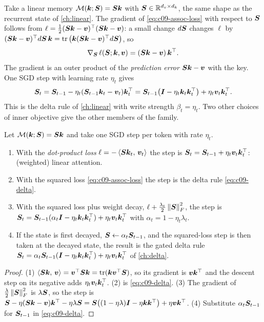 Take a linear memory $\mathcal{M}(\bm{k}; \bm{S}) = \bm{S}\bm{k}$ with $\bm{S} \in \mathbb{R}^{d_v \times d_k}$, the
same shape as the recurrent state of \cref{ch:linear}. The gradient of
\eqref{eq:c09-assoc-loss} with respect to $\bm{S}$ follows from
$\ell = \frac12 (\bm{S}\bm{k} - \bm{v})^{\top}(\bm{S}\bm{k} - \bm{v})$: a small change $d\bm{S}$ changes $\ell$ by
$(\bm{S}\bm{k} - \bm{v})^{\top} d\bm{S}\,\bm{k} = \operatorname{tr}\big(\bm{k} (\bm{S}\bm{k}-\bm{v})^{\top} d\bm{S}\big)$, so
\begin{equation}\label{eq:c09-lin-grad}
  \nabla_{\bm{S}}\, \ell(\bm{S}; \bm{k}, \bm{v}) = (\bm{S}\bm{k} - \bm{v})\,\bm{k}^{\top} .
\end{equation}
The gradient is an outer product of the \emph{prediction error} $\bm{S}\bm{k} - \bm{v}$ with the key.
One SGD step with learning rate $\eta_t$ gives
\begin{equation}\label{eq:c09-delta}
  \bm{S}_t = \bm{S}_{t-1} - \eta_t (\bm{S}_{t-1}\bm{k}_t - \bm{v}_t)\bm{k}_t^{\top}
        = \bm{S}_{t-1}\big(\bm{I} - \eta_t \bm{k}_t\bm{k}_t^{\top}\big) + \eta_t \bm{v}_t\bm{k}_t^{\top} .
\end{equation}
This is the delta rule of \cref{ch:linear} with write strength $\beta_t = \eta_t$. Two other
choices of inner objective give the other members of the family.

\begin{proposition}\label{prop:c09-family}
Let $\mathcal{M}(\bm{k};\bm{S}) = \bm{S}\bm{k}$ and take one SGD step per token with rate $\eta_t$.
\begin{enumerate}
  \item With the \emph{dot-product loss} $\ell = -\left\langle \bm{S}\bm{k}_t,\, \bm{v}_t\right\rangle$ the step is
        $\bm{S}_t = \bm{S}_{t-1} + \eta_t \bm{v}_t\bm{k}_t^{\top}$: (weighted) linear attention.
  \item With the squared loss \eqref{eq:c09-assoc-loss} the step is the delta rule
        \eqref{eq:c09-delta}.
  \item With the squared loss plus weight decay, $\ell + \frac{\lambda_t}{2}\left\lVert \bm{S}\right\rVert_F^2$,
        the step is $\bm{S}_t = \bm{S}_{t-1}(\alpha_t \bm{I} - \eta_t\bm{k}_t\bm{k}_t^{\top}) + \eta_t\bm{v}_t\bm{k}_t^{\top}$
        with $\alpha_t = 1 - \eta_t\lambda_t$.
  \item If the state is first decayed, $\bm{S} \leftarrow \alpha_t\bm{S}_{t-1}$, and the squared-loss
        step is then taken at the decayed state, the result is the gated delta rule
        $\bm{S}_t = \alpha_t\bm{S}_{t-1}(\bm{I} - \eta_t\bm{k}_t\bm{k}_t^{\top}) + \eta_t\bm{v}_t\bm{k}_t^{\top}$ of
        \cref{ch:delta}.
\end{enumerate}
\end{proposition}
\begin{proof}
(1) $\left\langle \bm{S}\bm{k},\, \bm{v}\right\rangle = \bm{v}^{\top}\bm{S}\bm{k} = \operatorname{tr}(\bm{k}\bm{v}^{\top}\bm{S})$, so its gradient is $\bm{v}\bm{k}^{\top}$ and
the descent step on its negative adds $\eta_t\bm{v}_t\bm{k}_t^{\top}$. (2) is \eqref{eq:c09-delta}.
(3) The gradient of $\frac{\lambda}{2}\left\lVert \bm{S}\right\rVert_F^2$ is $\lambda\bm{S}$, so the step is
$\bm{S} - \eta(\bm{S}\bm{k}-\bm{v})\bm{k}^{\top} - \eta\lambda\bm{S} = \bm{S}\big((1-\eta\lambda)\bm{I} - \eta\bm{k}\bm{k}^{\top}\big)
+ \eta\bm{v}\bm{k}^{\top}$. (4) Substitute $\alpha_t\bm{S}_{t-1}$ for $\bm{S}_{t-1}$ in \eqref{eq:c09-delta}.
\end{proof}

